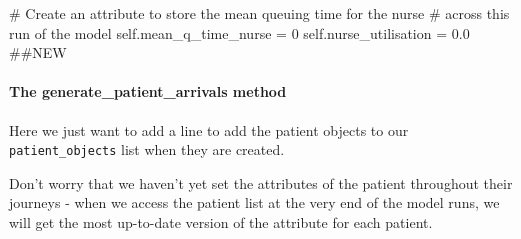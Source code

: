 \documentclass[
  letterpaper,
  DIV=11,
  numbers=noendperiod]{scrreprt}
\let\oldparagraph\paragraph
\renewcommand{\paragraph}[1]{\oldparagraph{#1}\mbox{}}
\newenvironment{Shaded}{}{}
\newcommand{\CommentTok}[1]{\textcolor[rgb]{0.42,0.45,0.49}{#1}}
\newcommand{\DecValTok}[1]{\textcolor[rgb]{0.00,0.36,0.77}{#1}}
\newcommand{\FloatTok}[1]{\textcolor[rgb]{0.00,0.36,0.77}{#1}}
\newcommand{\NormalTok}[1]{\textcolor[rgb]{0.14,0.16,0.18}{#1}}
\newcommand{\OperatorTok}[1]{\textcolor[rgb]{0.14,0.16,0.18}{#1}}
\newcommand{\VariableTok}[1]{\textcolor[rgb]{0.89,0.38,0.04}{#1}}
\begin{document}
\begin{Shaded}
\begin{Highlighting}[]
        \CommentTok{\# Create an attribute to store the mean queuing time for the nurse}
        \CommentTok{\# across this run of the model}
        \VariableTok{self}\NormalTok{.mean\_q\_time\_nurse }\OperatorTok{=} \DecValTok{0}
        \VariableTok{self}\NormalTok{.nurse\_utilisation }\OperatorTok{=} \FloatTok{0.0} \CommentTok{\#\#NEW}
\end{Highlighting}
\end{Shaded}

\paragraph{The generate\_patient\_arrivals
method}\label{the-generate_patient_arrivals-method}

Here we just want to add a line to add the patient objects to our
\texttt{patient\_objects} list when they are created.

Don't worry that we haven't yet set the attributes of the patient
throughout their journeys - when we access the patient list at the very
end of the model runs, we will get the most up-to-date version of the
attribute for each patient.
\end{document}
